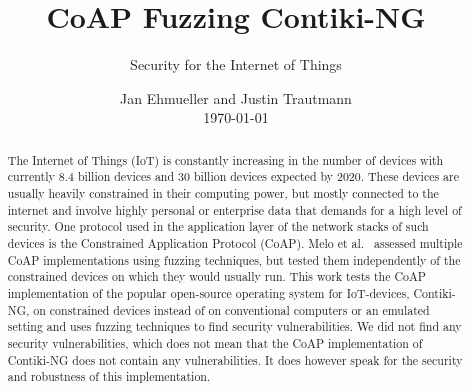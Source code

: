 \documentclass[sigconf]{acmart}
\begin{document}
\title{CoAP Fuzzing Contiki-NG}
\subtitle{Security for the Internet of Things}

\author{Jan Ehmueller and Justin Trautmann \\ \today}

\begin{abstract}
The Internet of Things (IoT) is constantly increasing in the number of devices with currently 8.4 billion devices and 30 billion devices expected by 2020. These devices are usually heavily constrained in their computing power, but mostly connected to the internet and involve highly personal or enterprise data that demands for a high level of security. One protocol used in the application layer of the network stacks of such devices is the Constrained Application Protocol (CoAP).
Melo et al.~\cite{Melo2017RobustnessTO} assessed multiple CoAP implementations using fuzzing techniques, but tested them independently of the constrained devices on which they would usually run. This work tests the CoAP implementation of the popular open-source operating system for IoT-devices, Contiki-NG, on constrained devices instead of on conventional computers or an emulated setting and uses fuzzing techniques to find security vulnerabilities.
We did not find any security vulnerabilities, which does not mean that the CoAP implementation of Contiki-NG does not contain any vulnerabilities. It does however speak for the security and robustness of this implementation.
\end{abstract}

\maketitle

\glsresetall









\balance



\end{document}
